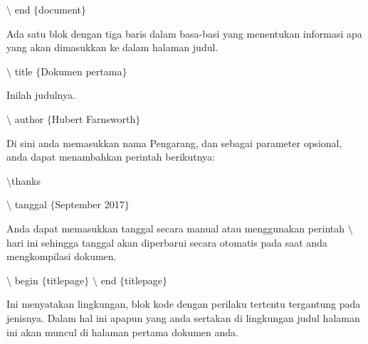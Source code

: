 \begin{itemize}
\hspace*{0.5in}$\setminus$ end $ \{ $document$ \} $\par

Ada satu blok dengan tiga baris dalam basa-basi yang menentukan informasi apa yang akan dimasukkan ke dalam halaman judul.\par

\hspace*{0.5in}$\setminus$ title $ \{ $Dokumen pertama$ \} $\par

\hspace*{0.5in}Inilah judulnya.\par

\hspace*{0.5in}$\setminus$ author $ \{ $Hubert Farnsworth$ \} $\par

\hspace*{0.5in}Di sini anda memasukkan nama Pengarang, dan sebagai parameter opsional, anda dapat \hspace*{0.5in}menambahkan perintah berikutnya:\par

\hspace*{0.5in}$\setminus$thanks\par

\hspace*{0.5in}$\setminus$ tanggal $ \{ $September 2017$ \} $\par

\hspace*{0.5in}Anda dapat memasukkan tanggal secara manual atau menggunakan perintah $\setminus$ hari ini \hspace*{0.5in}sehingga tanggal akan diperbarui secara otomatis pada saat anda mengkompilasi dokumen. \par

\hspace*{0.5in}$\setminus$ begin $ \{ $titlepage$ \} $ $\setminus$ end $ \{ $titlepage$ \} $\par

\hspace*{0.5in}Ini menyatakan lingkungan, blok kode dengan perilaku tertentu tergantung pada jenisnya. \hspace*{0.5in}Dalam hal ini apapun yang anda sertakan di lingkungan judul halaman ini akan muncul di \hspace*{0.5in}halaman pertama dokumen anda.\par


\end{itemize}
